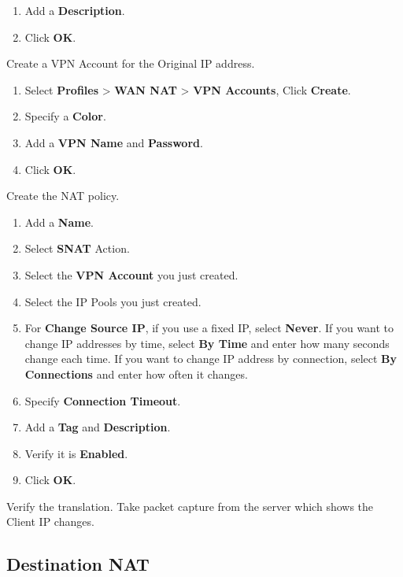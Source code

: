 \begin{description}
\begin{enumerate}
        \item 	Add a \textbf{Description}.
        \item 	Click \textbf{OK}.
    \end{enumerate} 
    \item[STEP 2.]	Create a VPN Account for the Original IP address.
    \begin{enumerate} 
        \item	Select \textbf{Profiles} > \textbf{WAN NAT} > \textbf{VPN Accounts}, Click \textbf{Create}.
        \item	Specify a \textbf{Color}.
        \item	Add a \textbf{VPN Name} and \textbf{Password}.
        \item	Click \textbf{OK}.
    \end{enumerate}
    \item[STEP 3.]	Create the NAT policy.
    \begin{enumerate}
        \item	Add a \textbf{Name}.
        \item	Select \textbf{SNAT} Action.
        \item	Select the \textbf{VPN Account} you just created. 
        \item	Select the IP Pools you just created. 
        \item For \textbf{Change Source IP}, if you use a fixed IP, select \textbf{Never}. 
        If you want to change IP addresses by time, select \textbf{By Time} and enter how many seconds change each time. 
        If you want to change IP address by connection, select \textbf{By Connections} and enter how often it changes.
        \item	Specify \textbf{Connection Timeout}.
        \item	Add a \textbf{Tag} and \textbf{Description}.
        \item	Verify it is \textbf{Enabled}.
        \item	Click \textbf{OK}.
    \end{enumerate}
    \item[STEP 4.]	Verify the translation. Take packet capture from the server which shows the Client IP changes.
\end{description}

\subsection*{\hypertarget{link:Destination NAT}{Destination NAT}}
\label{sec:policies:security:dnat}

